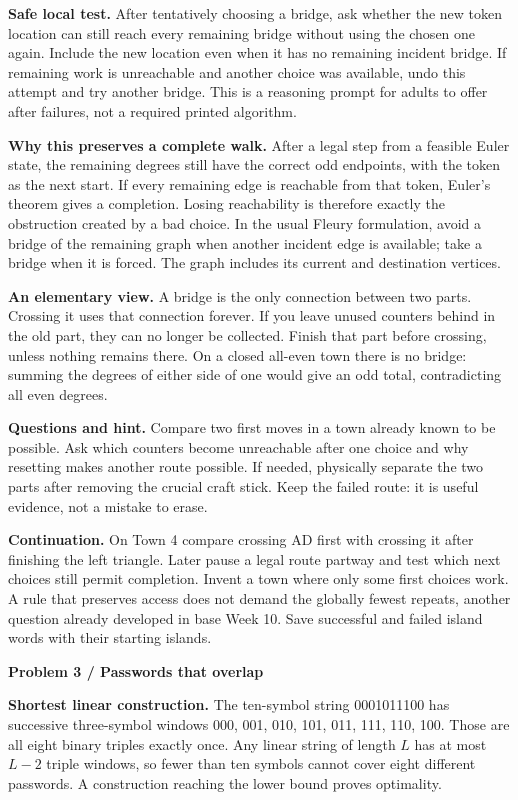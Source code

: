 \documentclass[11pt]{article}
\newcommand{\parttitle}[1]{{\large\bfseries\color{ink}#1}\par}
\newcommand{\labelled}[2]{\textbf{#1} #2\par}
\begin{document}
\labelled{Safe local test.}{After tentatively choosing a bridge, ask whether the new token location can still reach every remaining bridge without using the chosen one again. Include the new location even when it has no remaining incident bridge. If remaining work is unreachable and another choice was available, undo this attempt and try another bridge. This is a reasoning prompt for adults to offer after failures, not a required printed algorithm.}
\labelled{Why this preserves a complete walk.}{After a legal step from a feasible Euler state, the remaining degrees still have the correct odd endpoints, with the token as the next start. If every remaining edge is reachable from that token, Euler's theorem gives a completion. Losing reachability is therefore exactly the obstruction created by a bad choice. In the usual Fleury formulation, avoid a bridge of the remaining graph when another incident edge is available; take a bridge when it is forced. The graph includes its current and destination vertices.}
\labelled{An elementary view.}{A bridge is the only connection between two parts. Crossing it uses that connection forever. If you leave unused counters behind in the old part, they can no longer be collected. Finish that part before crossing, unless nothing remains there. On a closed all-even town there is no bridge: summing the degrees of either side of one would give an odd total, contradicting all even degrees.}
\labelled{Questions and hint.}{Compare two first moves in a town already known to be possible. Ask which counters become unreachable after one choice and why resetting makes another route possible. If needed, physically separate the two parts after removing the crucial craft stick. Keep the failed route: it is useful evidence, not a mistake to erase.}
\labelled{Continuation.}{On Town 4 compare crossing AD first with crossing it after finishing the left triangle. Later pause a legal route partway and test which next choices still permit completion. Invent a town where only some first choices work. A rule that preserves access does not demand the globally fewest repeats, another question already developed in base Week 10. Save successful and failed island words with their starting islands.}
\newpage
\parttitle{Problem 3 / Passwords that overlap}
\labelled{Shortest linear construction.}{The ten-symbol string 0001011100 has successive three-symbol windows 000, 001, 010, 101, 011, 111, 110, 100. Those are all eight binary triples exactly once. Any linear string of length $L$ has at most $L-2$ triple windows, so fewer than ten symbols cannot cover eight different passwords. A construction reaching the lower bound proves optimality.}
\end{document}
